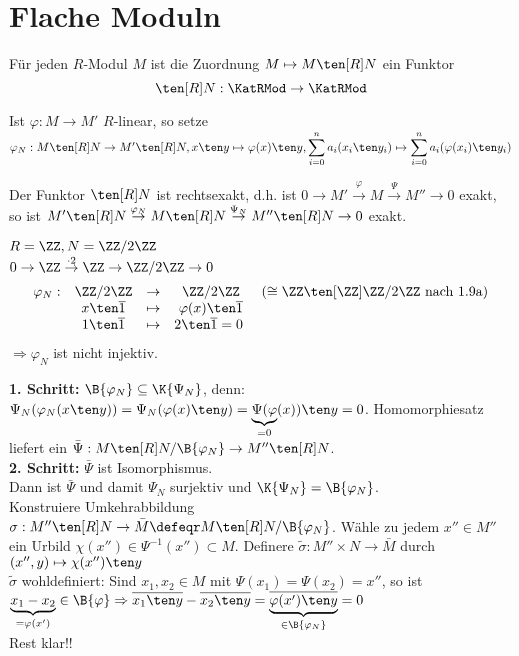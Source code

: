 \section{Flache Moduln}

\begin{Bem}
  Für jeden $R$-Modul $M$ ist die Zuordnung $M \mapsto M \ten[R] N$ ein Funktor
  \[
  \ten[R] N: \KatRMod \to \KatRMod
  \]
\end{Bem}

\begin{Bew} 
  Ist $\varphi: M \to M'$ $R$-linear, so setze $\varphi_N: M \ten[R] N \to M'
  \ten[R] N, x \ten y \mapsto \varphi(x) \ten y, \displaystyle
  \sum_{i=0}^na_i(x_i \ten y_i) \mapsto \sum_{i=0}^n a_i(\varphi(x_i) \ten y_i)$
\end{Bew}

\begin{Prop}
\label{1.12}
  Der Funktor $\ten[R] N$ ist rechtsexakt, d.h. ist $0 \to M'
  \overset{\varphi}{\to} M \overset{\Psi}{\to} M'' \to 0$ exakt, so ist $ M'
  \ten[R] N \overset{\varphi_N}{\to} M \ten[R] N \overset{\Psi_N}{\to} M'' \ten[R] N
  \to 0$ exakt.
\end{Prop}

\begin{nnBsp} 
  $R = \ZZ, N = \ZZ/2 \ZZ$\\
  $0 \to \ZZ \overset{ \cdot 2}{\to} \ZZ \to \ZZ/2
  \ZZ \to 0$
  \[
  \begin{matrix}
  \varphi_N:& \ZZ/2 \ZZ &\to& \ZZ / 2 \ZZ &(\cong \ZZ \ten[\ZZ] \ZZ / 2 \ZZ
  \text{ nach 1.9a})\\
  &x\ten\overline 1 & \mapsto & \varphi(x)\ten\overline 1&\\
  &1\ten\overline 1&\mapsto&2\ten\overline 1=0\
  \end{matrix}
  \]
  $\Rightarrow \varphi_N$ ist nicht injektiv.
\end{nnBsp}

\begin{Bew} 
  \textbf{1. Schritt:} $\B{\varphi_N} \subseteq \K{\Psi_N}$,
  denn: $\Psi_N(\varphi_N(x \ten y)) = \Psi_N(\varphi(x) \ten y) =
  \underset{=0}{\underbrace{\Psi(\varphi}}(x)) \ten y = 0$. Homomorphiesatz
  liefert ein $\bar{\Psi}: M \ten[R] N/\B{\varphi_N} \to M'' \ten[R]
  N$.\\
  \textbf{2. Schritt:} $\bar{\Psi}$ ist Isomorphismus.\\
  Dann ist $\bar{\Psi}$ und damit $\Psi_N$ surjektiv und $\K{\Psi_N} =
  \B{\varphi_N}$.\\
  Konstruiere Umkehrabbildung $\sigma: M'' \ten[R] N \to \bar{M} \defeqr M
  \ten[R] N/\B{\varphi_N}$. Wähle zu jedem $x'' \in M''$ ein Urbild
  $\chi(x'') \in \Psi^{-1}(x'') \subset M$.
  Definere $\tilde{\sigma}: M'' \times N \to \bar{M}$ durch $(x'', y) \mapsto
  \chi(x'') \ten y$\\
  $\tilde{\sigma}$ wohldefiniert:
  Sind $x_1,x_2 \in M$ mit $\Psi(x_1) = \Psi(x_2) = x''$, so ist $\underset{= \varphi(x')
  }{\underbrace{x_1 - x_2}} \in \B{\varphi} \Rightarrow \overline{x_1
  \ten y} - \overline{x_2 \ten y} = \underset{\in \B{\varphi_N}
  }{\underbrace{\overline{\varphi(x') \ten y}}} = 0$\\
  Rest klar!!
\end{Bew}

